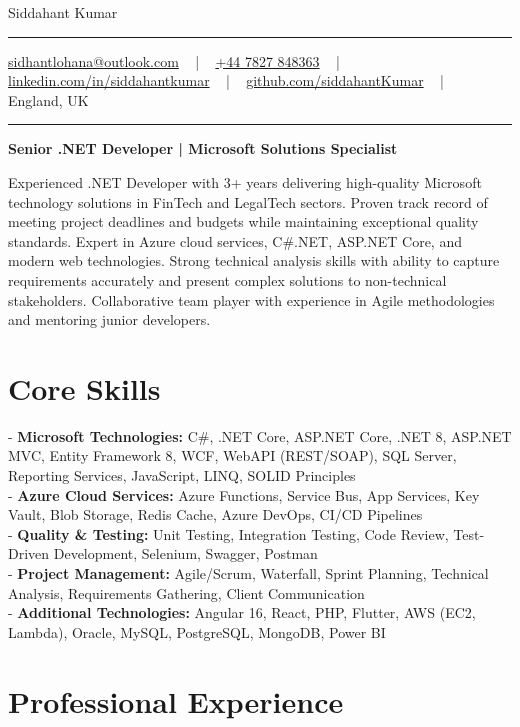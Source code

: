 \documentclass[letterpaper,10pt]{article}
\newcommand{\documentTitle}[2]{
  \begin{center}
    \vspace*{-0.3in}
    {\Huge\color{accentTitle} #1}
    \vspace{8pt}
    {\color{accentLine} \hrule}
    \vspace{2pt}
    \footnotesize{#2}
    \vspace{2pt}
    {\color{accentLine} \hrule}
  \end{center}
}
\begin{document}
\documentTitle{Siddahant Kumar}{
\vspace{0.1cm}
\href{mailto:sidhantlohana@outlook.com}{sidhantlohana@outlook.com} ~ | ~
\href{tel:+447827848363}{+44 7827 848363} ~ | ~
\href{https://www.linkedin.com/in/siddahantkumar/}{linkedin.com/in/siddahantkumar} ~ | ~
\href{https://github.com/siddahantKumar}{github.com/siddahantKumar} ~ | ~
England, UK
}

\begin{center}
\textbf{Senior .NET Developer | Microsoft Solutions Specialist}
\end{center}

Experienced .NET Developer with 3+ years delivering high-quality Microsoft technology solutions in FinTech and LegalTech sectors. Proven track record of meeting project deadlines and budgets while maintaining exceptional quality standards. Expert in Azure cloud services, C\#.NET, ASP.NET Core, and modern web technologies. Strong technical analysis skills with ability to capture requirements accurately and present complex solutions to non-technical stakeholders. Collaborative team player with experience in Agile methodologies and mentoring junior developers.

\section{Core Skills}

\noindent
- \textbf{Microsoft Technologies:} C\#, .NET Core, ASP.NET Core, .NET 8, ASP.NET MVC, Entity Framework 8, WCF, WebAPI (REST/SOAP), SQL Server, Reporting Services, JavaScript, LINQ, SOLID Principles \\
- \textbf{Azure Cloud Services:} Azure Functions, Service Bus, App Services, Key Vault, Blob Storage, Redis Cache, Azure DevOps, CI/CD Pipelines \\
- \textbf{Quality \& Testing:} Unit Testing, Integration Testing, Code Review, Test-Driven Development, Selenium, Swagger, Postman \\
- \textbf{Project Management:} Agile/Scrum, Waterfall, Sprint Planning, Technical Analysis, Requirements Gathering, Client Communication \\
- \textbf{Additional Technologies:} Angular 16, React, PHP, Flutter, AWS (EC2, Lambda), Oracle, MySQL, PostgreSQL, MongoDB, Power BI

\section{Professional Experience}
\end{document}
